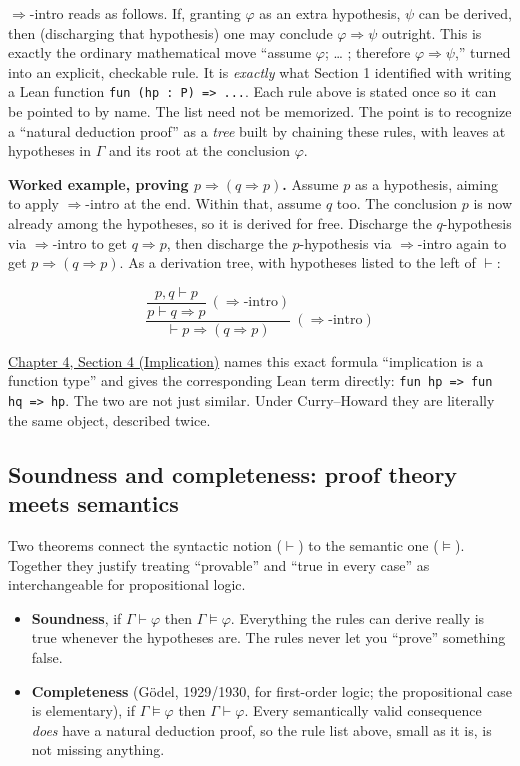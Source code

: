 \(\Rightarrow\)-intro reads as follows. If, granting \(\varphi\) as an extra hypothesis, \(\psi\) can be derived, then (discharging that hypothesis) one may conclude \(\varphi \Rightarrow \psi\) outright. This is exactly the ordinary mathematical move ``assume \(\varphi\); \ldots{} ; therefore \(\varphi
\Rightarrow \psi\),'' turned into an explicit, checkable rule. It is \emph{exactly} what Section 1 identified with writing a Lean function \texttt{fun (hp : P) => ...}. Each rule above is stated once so it can be pointed to by name. The list need not be memorized. The point is to recognize a ``natural deduction proof'' as a \emph{tree} built by chaining these rules, with leaves at hypotheses in \(\Gamma\) and its root at the conclusion \(\varphi\).

\textbf{Worked example, proving \(p \Rightarrow (q \Rightarrow p)\).} Assume \(p\) as a hypothesis, aiming to apply \(\Rightarrow\)-intro at the end. Within that, assume \(q\) too. The conclusion \(p\) is now already among the hypotheses, so it is derived for free. Discharge the \(q\)-hypothesis via \(\Rightarrow\)-intro to get \(q \Rightarrow p\), then discharge the \(p\)-hypothesis via \(\Rightarrow\)-intro again to get \(p \Rightarrow (q \Rightarrow p)\). As a derivation tree, with hypotheses listed to the left of \(\vdash\):

\[
\dfrac{\dfrac{p, q \vdash p}{p \vdash q \Rightarrow p}\ (\Rightarrow\text{-intro})}
{\vdash p \Rightarrow (q \Rightarrow p)}\ (\Rightarrow\text{-intro})
\]

\hyperref[sec:04-propositions-and-proofs:04-implication:1]{Chapter 4, Section 4 (Implication)} names this exact formula ``implication is a function type'' and gives the corresponding Lean term directly: \texttt{fun hp => fun hq => hp}. The two are not just similar. Under Curry--Howard they are literally the same object, described twice.

\subsection{Soundness and completeness: proof theory meets semantics}\label{sec:04-propositions-and-proofs:02-logic-recap:5}

Two theorems connect the syntactic notion (\(\vdash\)) to the semantic one (\(\models\)). Together they justify treating ``provable'' and ``true in every case'' as interchangeable for propositional logic.

\begin{itemize}
\tightlist
\item
  \textbf{Soundness}, if \(\Gamma \vdash \varphi\) then \(\Gamma \models \varphi\). Everything the rules can derive really is true whenever the hypotheses are. The rules never let you ``prove'' something false.
\item
  \textbf{Completeness} (Gödel, 1929/1930, for first-order logic; the propositional case is elementary), if \(\Gamma \models \varphi\) then \(\Gamma \vdash
  \varphi\). Every semantically valid consequence \emph{does} have a natural deduction proof, so the rule list above, small as it is, is not missing anything.
\end{itemize}

